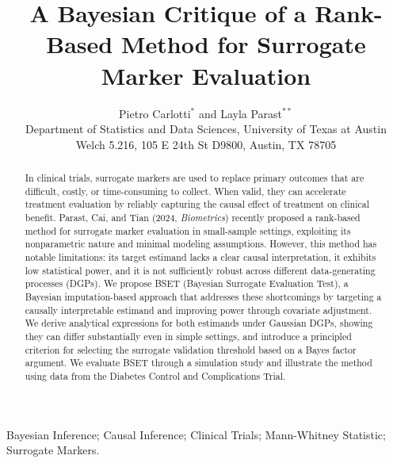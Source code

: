 \documentclass[referee,usenatbib]{biom}
\begin{document}
\label{firstpage}

\setlength\parindent{15pt}

\title[A Bayesian Surrogate Evaluation Test]{A Bayesian Critique of a Rank-Based Method for Surrogate Marker Evaluation}

\author[Carlotti and Parast]{Pietro Carlotti$^{*}$ and
Layla Parast$^{**}$ \\
Department of Statistics and Data Sciences, University of Texas at Austin \\
Welch 5.216, 105 E 24th St D9800, Austin, TX 78705}

\begin{abstract}
In clinical trials, surrogate markers are used to replace primary outcomes that are difficult, costly, or time-consuming to collect. When valid, they can accelerate treatment evaluation by reliably capturing the causal effect of treatment on clinical benefit. Parast, Cai, and Tian (2024, \textit{Biometrics}) recently proposed a rank-based method for surrogate marker evaluation in small-sample settings, exploiting its nonparametric nature and minimal modeling assumptions. However, this method has notable limitations: its target estimand lacks a clear causal interpretation, it exhibits low statistical power, and it is not sufficiently robust across different data-generating processes (DGPs). We propose BSET (Bayesian Surrogate Evaluation Test), a Bayesian imputation-based approach that addresses these shortcomings by targeting a causally interpretable estimand and improving power through covariate adjustment. We derive analytical expressions for both estimands under Gaussian DGPs, showing they can differ substantially even in simple settings, and introduce a principled criterion for selecting the surrogate validation threshold based on a Bayes factor argument. We evaluate BSET through a simulation study and illustrate the method using data from the Diabetes Control and Complications Trial.
\end{abstract}

\begin{keywords}
Bayesian Inference; Causal Inference; Clinical Trials; Mann-Whitney Statistic; Surrogate Markers.
\end{keywords}

\maketitle
\end{document}
